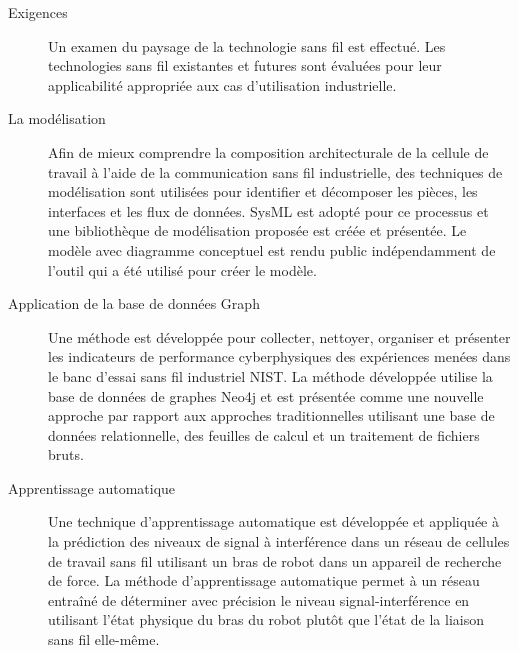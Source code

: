 \documentclass[12pt]{article}
\begin{document}
		\begin{description}
			
			\item[Exigences]
			\cite{CandellRW2017} \cite{Montgomery2019} \cite{Candell2018.IWSGuide} \cite{ieeeMagazine2018} Un examen du paysage de la technologie sans fil est effectué. Les technologies sans fil existantes et futures sont évaluées pour leur applicabilité appropriée aux cas d'utilisation industrielle.
			
			\item[La modélisation] \cite{Candell2019ASR.SYSML} \cite{Candell2018SysML.JRES} Afin de mieux comprendre la composition architecturale de la cellule de travail à l'aide de la communication sans fil industrielle, des techniques de modélisation sont utilisées pour identifier et décomposer les pièces, les interfaces et les flux de données. SysML est adopté pour ce processus et une bibliothèque de modélisation proposée est créée et présentée. Le modèle avec diagramme conceptuel est rendu public indépendamment de l'outil qui a été utilisé pour créer le modèle.
			
			\item[Application de la base de données Graph] \cite{CandellISIT2020.Conf} Une méthode est développée pour collecter, nettoyer, organiser et présenter les indicateurs de performance cyberphysiques des expériences menées dans le banc d'essai sans fil industriel NIST. La méthode développée utilise la base de données de graphes Neo4j et est présentée comme une nouvelle approche par rapport aux approches traditionnelles utilisant une base de données relationnelle, des feuilles de calcul et un traitement de fichiers bruts.
			
			\item[Apprentissage automatique] \cite{CandellISIE2019.Conf} \cite{CandellIJAMT2020.Jrnl} Une technique d'apprentissage automatique est développée et appliquée à la prédiction des niveaux de signal à interférence dans un réseau de cellules de travail sans fil utilisant un bras de robot dans un appareil de recherche de force. La méthode d'apprentissage automatique permet à un réseau entraîné de déterminer avec précision le niveau signal-interférence en utilisant l'état physique du bras du robot plutôt que l'état de la liaison sans fil elle-même.
			
		\end{description}
	
\end{document}
